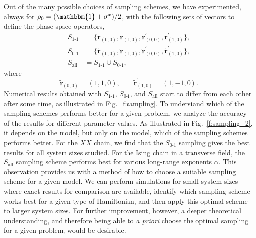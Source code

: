 \documentclass[aps,prl,showpacs,amsmath,amssymb,superscriptaddress,reprint,10pt]{revtex4-1}
\newcommand\id{{\mathbbm{1}}}
\newcommand{\mvec}[1]{\boldsymbol #1}
\begin{document}
\begin{bibunit}
Out of the many possible choices of sampling schemes, we have experimented, always for $\rho_0 = (\id+\sigma^x)/2$, with the following sets of vectors to define the phase space operators,
\begin{subequations}
\begin{align}
S_{\text{1-1}}&=\bigl\{\mvec{r}_{(0,0)},\mvec{r}_{(1,0)},\mvec{r}_{(0,0)}^\prime,\mvec{r}_{(1,0)}^\prime\bigr\},\label{e:S11}\\
S_{\text{0-1}}&=\bigl\{\tilde{\mvec{r}}_{(0,0)},\tilde{\mvec{r}}_{(1,0)},\tilde{\mvec{r}}_{(0,0)}^\prime,\tilde{\mvec{r}}_{(1,0)}^\prime\bigr\},\\
S_{\text{all}}&=S_{\text{1-1}}\cup S_{\text{0-1}},\label{e:Sall}
\end{align}
\end{subequations}
where
\begin{equation}
\tilde{\mvec{r}}_{(0,0)}^\prime=(1,1,0),\qquad \tilde{\mvec{r}}_{(1,0)}^\prime=(1,-1,0).
\end{equation}
Numerical results obtained with $S_{\text{1-1}}$, $S_{\text{0-1}}$, and $S_{\text{all}}$ start to differ from each other after some time, as illustrated in Fig.~\ref{f:sampling}. To understand which of the sampling schemes performs better for a given problem, we analyze the accuracy of the results for different parameter values. As illustrated in Fig.~\ref{f:sampling_2}, it depends on the model, but only on the model, which of the sampling schemes performs better. For the $XX$ chain, we find that the $S_{\text{0-1}}$ sampling gives the best results for all system sizes studied. For the Ising chain in a transverse field, the $S_{\text{all}}$ sampling scheme performs best for various long-range exponents $\alpha$. This observation provides us with a method of how to choose a suitable sampling scheme for a given model. We can perform simulations for small system sizes where exact results for comparison are available, identify which sampling scheme works best for a given type of Hamiltonian, and then apply this optimal scheme to larger system sizes. For further improvement, however, a deeper theoretical understanding, and therefore being able to {\em a priori}\/ choose the optimal sampling for a given problem, would be desirable.


\end{bibunit}
\end{document}
